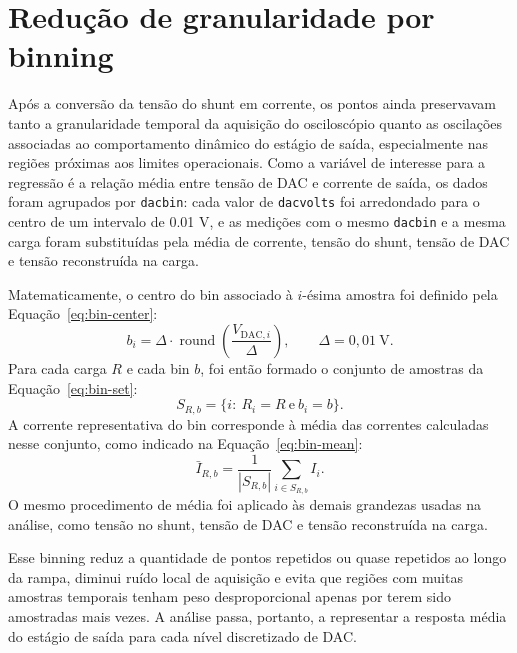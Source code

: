 \documentclass[
  brazilian,
]{article}
\renewcommand{\_}{\oldunderscore\discretionary{}{}{}}
\begin{document}
\clearpage

\section{Redução de granularidade por
binning}\label{reduuxe7uxe3o-de-granularidade-por-binning}

Após a conversão da tensão do shunt em corrente, os pontos ainda
preservavam tanto a granularidade temporal da aquisição do osciloscópio
quanto as oscilações associadas ao comportamento dinâmico do estágio de
saída, especialmente nas regiões próximas aos limites operacionais. Como
a variável de interesse para a regressão é a relação média entre tensão
de DAC e corrente de saída, os dados foram agrupados por
\texttt{dac\_bin}: cada valor de
\texttt{dac\_volts} foi arredondado para o centro de um intervalo de
0.01 V, e as medições com o mesmo \texttt{dac\_bin} e a mesma carga
foram substituídas pela média de corrente, tensão do shunt, tensão de
DAC e tensão reconstruída na carga.

Matematicamente, o centro do bin associado à \(i\)-ésima amostra foi
definido pela Equação~\ref{eq:bin-center}:
\begin{equation}
b_i = \Delta \cdot \operatorname{round}
\left(\frac{V_{\mathrm{DAC},i}}{\Delta}\right),
\qquad \Delta = 0{,}01\ \mathrm{V}.
\label{eq:bin-center}
\end{equation}
Para cada carga \(R\) e cada bin \(b\), foi então formado o conjunto de
amostras da Equação~\ref{eq:bin-set}:
\begin{equation}
S_{R,b} = \{i:\ R_i = R\ \text{e}\ b_i = b\}.
\label{eq:bin-set}
\end{equation}
A corrente representativa do bin corresponde à média das correntes
calculadas nesse conjunto, como indicado na Equação~\ref{eq:bin-mean}:
\begin{equation}
\bar{I}_{R,b} =
\frac{1}{|S_{R,b}|}\sum_{i\in S_{R,b}} I_i.
\label{eq:bin-mean}
\end{equation}
O mesmo procedimento de média foi aplicado às demais grandezas usadas na
análise, como tensão no shunt, tensão de DAC e tensão reconstruída na
carga.

Esse binning reduz a quantidade de pontos repetidos ou quase repetidos
ao longo da rampa, diminui ruído local de aquisição e evita que regiões
com muitas amostras temporais tenham peso desproporcional apenas por
terem sido amostradas mais vezes. A análise passa, portanto, a
representar a resposta média do estágio de saída para cada nível
discretizado de DAC.
\end{document}
